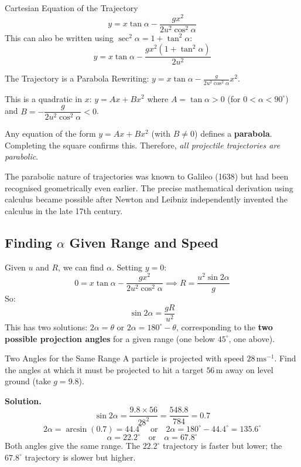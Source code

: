 \documentclass[12pt, a4paper]{book}
\newcommand{\ms}{\,\mathrm{ms}^{-1}}
\newcommand{\m}{\,\mathrm{m}}
\begin{document}
\begin{thm}{Cartesian Equation of the Trajectory}{}
\[
  \boxed{y = x\tan\alpha - \frac{gx^2}{2u^2\cos^2\alpha}}
\]
This can also be written using $\sec^2\alpha = 1 + \tan^2\alpha$:
\[
  y = x\tan\alpha - \frac{gx^2(1+\tan^2\alpha)}{2u^2}
\]
\end{thm}

\begin{thm}{The Trajectory is a Parabola}{}
Rewriting: $y = x\tan\alpha - \frac{g}{2u^2\cos^2\alpha}x^2$.

This is a quadratic in $x$: $y = Ax + Bx^2$ where $A = \tan\alpha > 0$ (for $0 < \alpha < 90^\circ$) and $B = -\dfrac{g}{2u^2\cos^2\alpha} < 0$.

Any equation of the form $y = Ax + Bx^2$ (with $B \neq 0$) defines a \textbf{parabola}. Completing the square confirms this. Therefore, \emph{all projectile trajectories are parabolic}.
\end{thm}

\begin{historicalbox}
The parabolic nature of trajectories was known to Galileo (1638) but had been recognised geometrically even earlier. The precise mathematical derivation using calculus became possible after Newton and Leibniz independently invented the calculus in the late 17th century.
\end{historicalbox}

\subsection{Finding $\alpha$ Given Range and Speed}

Given $u$ and $R$, we can find $\alpha$. Setting $y = 0$:
\[
  0 = x\tan\alpha - \frac{gx^2}{2u^2\cos^2\alpha} \implies R = \frac{u^2 \sin 2\alpha}{g}
\]
So:
\[
  \sin 2\alpha = \frac{gR}{u^2}
\]
This has two solutions: $2\alpha = \theta$ or $2\alpha = 180^\circ - \theta$, corresponding to the \textbf{two possible projection angles} for a given range (one below $45^\circ$, one above).

\begin{exmp}{Two Angles for the Same Range}{}
A particle is projected with speed $28\ms$. Find the angles at which it must be projected to hit a target $56\m$ away on level ground (take $g = 9.8$).

\medskip
\textbf{Solution.}
\[
  \sin 2\alpha = \frac{9.8 \times 56}{28^2} = \frac{548.8}{784} = 0.7
\]
\[
  2\alpha = \arcsin(0.7) = 44.4^\circ\quad\text{or}\quad 2\alpha = 180^\circ - 44.4^\circ = 135.6^\circ
\]
\[
  \alpha = 22.2^\circ\quad\text{or}\quad\alpha = 67.8^\circ
\]
Both angles give the same range. The $22.2^\circ$ trajectory is faster but lower; the $67.8^\circ$ trajectory is slower but higher.
\end{exmp}
\end{document}
